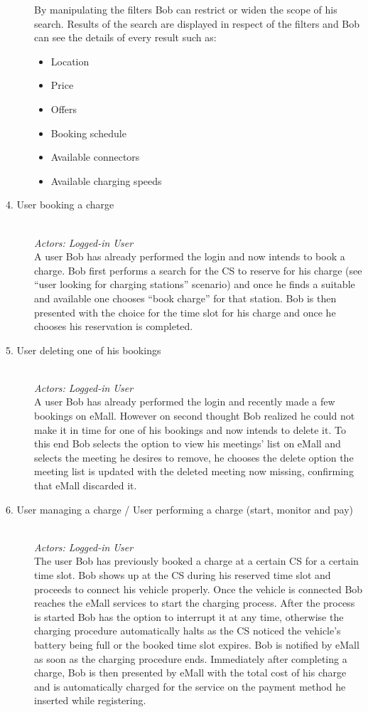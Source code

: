 \documentclass[11pt]{article}
\begin{document}
\begin{description}
\begin{itemize}
        \end{itemize}
        By manipulating the filters Bob can restrict or widen the scope of his search. Results of the search are displayed in respect of the filters and Bob can see the details of every result such as:
        \begin{itemize}
            \item Location
            \item Price
            \item Offers
            \item Booking schedule
            \item Available connectors
            \item Available charging speeds
        \end{itemize}
    \item [4. User booking a charge] \hfill \\
        \textit{Actors: Logged-in User} \\
        A user Bob has already performed the login and now intends to book a charge. Bob first performs a search for the CS to reserve for his charge (see “user looking for charging stations” scenario) and once he finds a suitable and available one chooses “book charge” for that station. Bob is then presented with the choice for the time slot for his charge and once he chooses his reservation is completed.
    \item [5. User deleting one of his bookings] \hfill \\
        \textit{Actors: Logged-in User} \\
        A user Bob has already performed the login and recently made a few bookings on eMall. However on second thought Bob realized he could not make it in time for one of his bookings and now intends to delete it. To this end Bob selects the option to view his meetings' list on eMall and selects the meeting he desires to remove, he chooses the delete option the meeting list is updated with the deleted meeting now missing, confirming that eMall discarded it.
    \item [6. User managing a charge / User performing a charge (start, monitor and pay)] \hfill \\
        \textit{Actors: Logged-in User} \\
        The user Bob has previously booked a charge at a certain CS for a certain time slot. Bob shows up at the CS during his reserved time slot and proceeds to connect his vehicle properly. Once the vehicle is connected Bob reaches the eMall services to start the charging process. After the process is started Bob has the option to interrupt it at any time, otherwise the charging procedure automatically halts as the CS noticed the vehicle’s battery being full or the booked time slot expires. Bob is notified by eMall as soon as the charging procedure ends. Immediately after completing a charge, Bob is then presented by eMall with the total cost of his charge and is automatically charged for the service on the payment method he inserted while registering.

\end{description}
\end{document}
